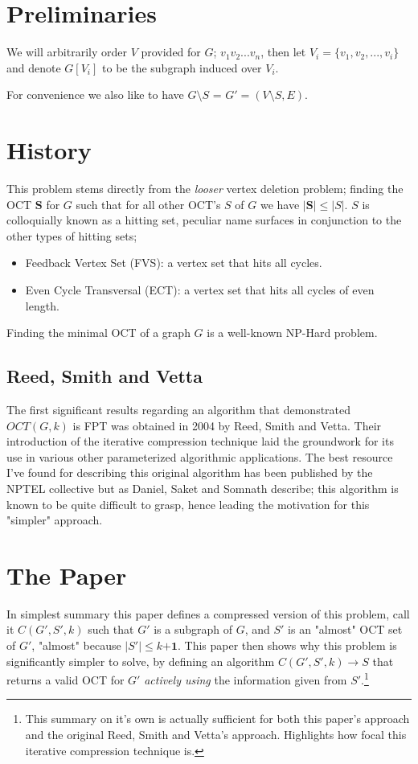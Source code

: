 \documentclass{article}
\begin{document}
\section{Preliminaries}
We will arbitrarily order $V$ provided for $G$; $v_1v_2...v_n$, then let $V_i = \{v_1,v_2,...,v_i\}$ and denote $G[V_i]$ to be the subgraph induced over $V_i$.

For convenience we also like to have $G \setminus S$ = $G' = (V \setminus S, E)$.

\section{History}
This problem stems directly from the {\em looser} vertex deletion problem; finding the OCT $\bm{S}$ for $G$ such that for all other OCT's $S$ of $G$ we have $|\bm{S}| \leq |S|$. $S$ is colloquially known as a hitting set, peculiar name surfaces in conjunction to the other types of hitting sets;
\begin{itemize}
				\item Feedback Vertex Set (FVS): a vertex set that hits all cycles.
				\item Even Cycle Transversal (ECT): a vertex set that hits all cycles of even length.
\end{itemize}
Finding the minimal OCT of a graph $G$ is a well-known NP-Hard problem.

\subsection{Reed, Smith and Vetta}
The first significant results regarding an algorithm that demonstrated $OCT(G,k)$ is FPT was obtained in 2004 by Reed, Smith and Vetta\cite{reed-smith-vetta}. Their introduction of the iterative compression technique laid the groundwork for its use in various other parameterized algorithmic applications. The best resource I've found for describing this original algorithm has been published by the NPTEL collective\cite{nptel} but as Daniel, Saket and Somnath describe; this algorithm is known to be quite difficult to grasp, hence leading the motivation for this "simpler" approach.

\section{The Paper}
In simplest summary this paper defines a compressed version of this problem, call it $C(G', S', k)$ such that $G'$ is a subgraph of $G$, and $S'$ is an "almost" OCT set of $G'$, "almost" because $|S'| \leq k \bm{+ 1}$. This paper then shows why this problem is significantly simpler to solve, by defining an algorithm $C(G', S', k) \rightarrow S$ that returns a valid OCT for $G'$ {\em actively using} the information given from $S'$.\footnote{This summary on it's own is actually sufficient for both this paper's approach and the original Reed, Smith and Vetta's approach. Highlights how focal this iterative compression technique is.}
\end{document}
